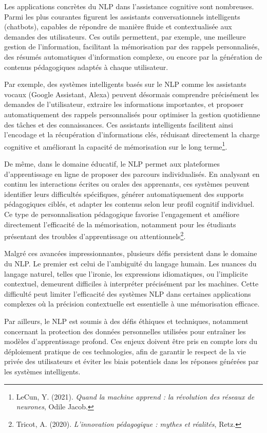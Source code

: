 \documentclass[12pt,a4paper]{report}
\begin{document}
Les applications concrètes du NLP dans l’assistance cognitive sont nombreuses. Parmi les plus courantes figurent les assistants conversationnels intelligents (chatbots), capables de répondre de manière fluide et contextualisée aux demandes des utilisateurs. Ces outils permettent, par exemple, une meilleure gestion de l’information, facilitant la mémorisation par des rappels personnalisés, des résumés automatiques d’information complexe, ou encore par la génération de contenus pédagogiques adaptés à chaque utilisateur.

Par exemple, des systèmes intelligents basés sur le NLP comme les assistants vocaux (Google Assistant, Alexa) peuvent désormais comprendre précisément les demandes de l’utilisateur, extraire les informations importantes, et proposer automatiquement des rappels personnalisés pour optimiser la gestion quotidienne des tâches et des connaissances. Ces assistants intelligents facilitent ainsi l’encodage et la récupération d'informations clés, réduisant directement la charge cognitive et améliorant la capacité de mémorisation sur le long terme\footnote{LeCun, Y. (2021). \textit{Quand la machine apprend : la révolution des réseaux de neurones}, Odile Jacob.}.

De même, dans le domaine éducatif, le NLP permet aux plateformes d’apprentissage en ligne de proposer des parcours individualisés. En analysant en continu les interactions écrites ou orales des apprenants, ces systèmes peuvent identifier leurs difficultés spécifiques, générer automatiquement des supports pédagogiques ciblés, et adapter les contenus selon leur profil cognitif individuel. Ce type de personnalisation pédagogique favorise l'engagement et améliore directement l'efficacité de la mémorisation, notamment pour les étudiants présentant des troubles d’apprentissage ou attentionnels\footnote{Tricot, A. (2020). \textit{L'innovation pédagogique : mythes et réalités}, Retz.}.

Malgré ces avancées impressionnantes, plusieurs défis persistent dans le domaine du NLP. Le premier est celui de l'ambiguïté du langage humain. Les nuances du langage naturel, telles que l’ironie, les expressions idiomatiques, ou l'implicite contextuel, demeurent difficiles à interpréter précisément par les machines. Cette difficulté peut limiter l’efficacité des systèmes NLP dans certaines applications complexes où la précision contextuelle est essentielle à une mémorisation efficace.

Par ailleurs, le NLP est soumis à des défis éthiques et techniques, notamment concernant la protection des données personnelles utilisées pour entraîner les modèles d’apprentissage profond. Ces enjeux doivent être pris en compte lors du déploiement pratique de ces technologies, afin de garantir le respect de la vie privée des utilisateurs et éviter les biais potentiels dans les réponses générées par les systèmes intelligents.
\end{document}
